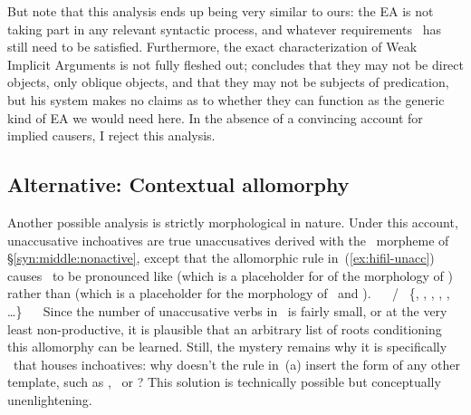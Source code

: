 But note that this analysis ends up being very similar to ours: the EA is not taking part in any relevant syntactic process, and whatever requirements \vd~has still need to be satisfied. Furthermore, the exact characterization of Weak Implicit Arguments is not fully fleshed out; \citet[380]{landau10} concludes that they may not be direct objects, only oblique objects, and that they may not be subjects of predication, but his system makes no claims as to whether they can function as the generic kind of EA we would need here. In the absence of a convincing account for implied causers, I reject this analysis.


	\subsection{Alternative: Contextual allomorphy}
Another possible analysis is strictly morphological in nature. Under this account, unaccusative inchoatives are true unaccusatives derived with the \vz~morpheme of \S\ref{syn:middle:nonactive}, except that the allomorphic rule in~(\ref{ex:hifil-unacc}) causes \vz~to be pronounced like  (which is a placeholder for of the morphology of \thif) rather than  (which is a placeholder for the morphology of \tnif~and \thit).
\pex
  \a \vz~\lra~ / \trace~\{, , , , , \dots \}\label{ex:hifil-unacc}
  \a \vz~\lra~
\xe
Since the number of unaccusative verbs in \thif~is fairly small, or at the very least non-productive, it is plausible that an arbitrary list of roots conditioning this allomorphy can be learned. Still, the mystery remains why it is specifically \thif~that houses inchoatives: why doesn't the rule in~(\lastx a) insert the form of any other template, such as \tkal, \tnif~or \tpie? This solution is technically possible but conceptually unenlightening.


